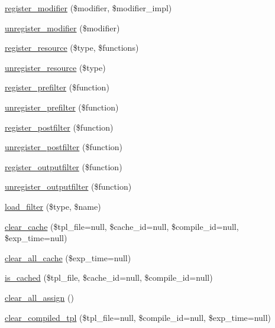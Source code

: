 \begin{DoxyCompactItemize}
\item 
\mbox{\hyperlink{class_smarty_a09bb18ca76e160136514e2b0ab197384}{register\+\_\+modifier}} (\$modifier, \$modifier\+\_\+impl)
\item 
\mbox{\hyperlink{class_smarty_a6240087cdda905b9f71594fe79c352bc}{unregister\+\_\+modifier}} (\$modifier)
\item 
\mbox{\hyperlink{class_smarty_acdc1ccac51bd5143aaccd10f8835563c}{register\+\_\+resource}} (\$type, \$functions)
\item 
\mbox{\hyperlink{class_smarty_aced4c3f27800c1a81c652fcf39fe9364}{unregister\+\_\+resource}} (\$type)
\item 
\mbox{\hyperlink{class_smarty_adeb671e9364ac6c40f58c403975d1c45}{register\+\_\+prefilter}} (\$function)
\item 
\mbox{\hyperlink{class_smarty_a2c799f52830b86afa153afaaa79028e2}{unregister\+\_\+prefilter}} (\$function)
\item 
\mbox{\hyperlink{class_smarty_a9cfd52c89ae4cbe89352edc3e6ecc0bd}{register\+\_\+postfilter}} (\$function)
\item 
\mbox{\hyperlink{class_smarty_af2872f8df62adbe2314c8e98d0e896e4}{unregister\+\_\+postfilter}} (\$function)
\item 
\mbox{\hyperlink{class_smarty_adecdc831f296e4ec4f90cea9e87bd2db}{register\+\_\+outputfilter}} (\$function)
\item 
\mbox{\hyperlink{class_smarty_aebd7a64f2b6ab20862c91ec82b9e8970}{unregister\+\_\+outputfilter}} (\$function)
\item 
\mbox{\hyperlink{class_smarty_af90eebfe6a4534e81585c5cc8967e006}{load\+\_\+filter}} (\$type, \$name)
\item 
\mbox{\hyperlink{class_smarty_a612d4aff6b1a9724d7ded0b6cba53166}{clear\+\_\+cache}} (\$tpl\+\_\+file=null, \$cache\+\_\+id=null, \$compile\+\_\+id=null, \$exp\+\_\+time=null)
\item 
\mbox{\hyperlink{class_smarty_a80118ff3000706420d2432c29e1858a9}{clear\+\_\+all\+\_\+cache}} (\$exp\+\_\+time=null)
\item 
\mbox{\hyperlink{class_smarty_a5f01eb89f03adcf0c9538567393f3226}{is\+\_\+cached}} (\$tpl\+\_\+file, \$cache\+\_\+id=null, \$compile\+\_\+id=null)
\item 
\mbox{\hyperlink{class_smarty_a4556e89301cf8d5a9363f11f2aa02c4e}{clear\+\_\+all\+\_\+assign}} ()
\item 
\mbox{\hyperlink{class_smarty_abff4f450f9855b5128d1d19be06ba77d}{clear\+\_\+compiled\+\_\+tpl}} (\$tpl\+\_\+file=null, \$compile\+\_\+id=null, \$exp\+\_\+time=null)

\end{DoxyCompactItemize}
